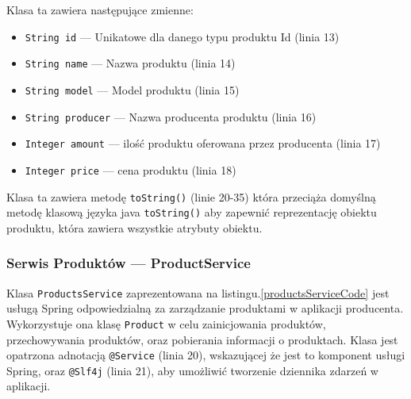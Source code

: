 Klasa ta zawiera następujące zmienne:
\begin{itemize}
    \item \verb|String id| --- Unikatowe dla danego typu produktu Id (linia 13)
    \item \verb|String name| --- Nazwa produktu (linia 14)
    \item \verb|String model| --- Model produktu (linia 15)
    \item \verb|String producer| --- Nazwa producenta produktu (linia 16)
    \item \verb|Integer amount| --- ilość produktu oferowana przez producenta (linia 17)
    \item \verb|Integer price| --- cena produktu (linia 18)
\end{itemize}

Klasa ta zawiera metodę \verb|toString()| (linie 20-35) która przeciąża domyślną metodę klasową języka java \verb|toString()| aby zapewnić reprezentację obiektu produktu, która zawiera wszystkie atrybuty obiektu.

\subsubsection{Serwis Produktów --- ProductService}

Klasa \verb|ProductsService| zaprezentowana na listingu.\ref{productsServiceCode} jest usługą Spring odpowiedzialną za zarządzanie produktami w aplikacji producenta. Wykorzystuje ona klasę \verb|Product| w celu zainicjowania produktów, przechowywania produktów, oraz pobierania informacji o produktach. Klasa jest opatrzona adnotacją \verb|@Service| (linia 20), wskazującej że jest to komponent usługi Spring, oraz \verb|@Slf4j| (linia 21), aby umożliwić tworzenie dziennika zdarzeń w aplikacji.


